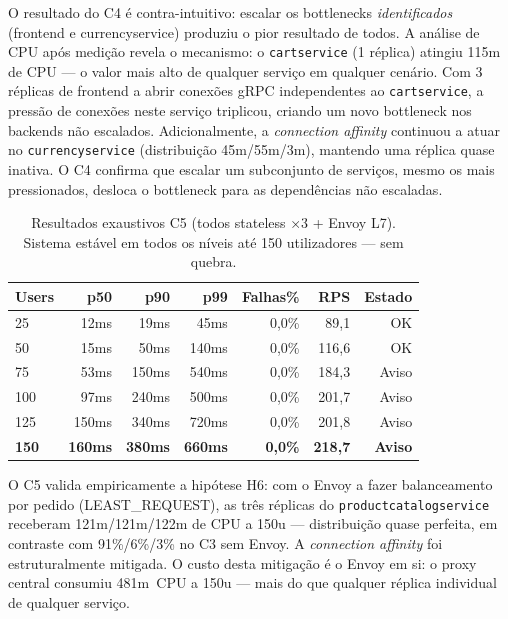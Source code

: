 \documentclass[acmsmall,screen=true,nonacm]{acmart}
\begin{document}
O resultado do C4 é contra-intuitivo: escalar os bottlenecks \emph{identificados} (frontend e currencyservice) produziu o pior resultado de todos. A análise de CPU após medição revela o mecanismo: o \texttt{cartservice} (1 réplica) atingiu 115m de CPU --- o valor mais alto de qualquer serviço em qualquer cenário. Com 3 réplicas de frontend a abrir conexões gRPC independentes ao \texttt{cartservice}, a pressão de conexões neste serviço triplicou, criando um novo bottleneck nos backends não escalados. Adicionalmente, a \textit{connection affinity} continuou a atuar no \texttt{currencyservice} (distribuição 45m/55m/3m), mantendo uma réplica quase inativa. O C4 confirma que escalar um subconjunto de serviços, mesmo os mais pressionados, desloca o bottleneck para as dependências não escaladas.

\begin{table}[h]
\caption{Resultados exaustivos C5 (todos stateless ×3 + Envoy L7). Sistema estável em todos os níveis até 150 utilizadores — sem quebra.}
\label{tab:c5ex}
\begin{tabular}{lrrrrrr}
\toprule
\textbf{Users} & \textbf{p50} & \textbf{p90} & \textbf{p99} & \textbf{Falhas\%} & \textbf{RPS} & \textbf{Estado} \\
\midrule
25  & 12ms  & 19ms  & 45ms  & 0,0\% & 89,1  & OK \\
50  & 15ms  & 50ms  & 140ms & 0,0\% & 116,6 & OK \\
75  & 53ms  & 150ms & 540ms & 0,0\% & 184,3 & Aviso \\
100 & 97ms  & 240ms & 500ms & 0,0\% & 201,7 & Aviso \\
125 & 150ms & 340ms & 720ms & 0,0\% & 201,8 & Aviso \\
\textbf{150} & \textbf{160ms} & \textbf{380ms} & \textbf{660ms} & \textbf{0,0\%} & \textbf{218,7} & \textbf{Aviso} \\
\bottomrule
\end{tabular}
\end{table}

O C5 valida empiricamente a hipótese H6: com o Envoy a fazer balanceamento por pedido (LEAST\_REQUEST), as três réplicas do \texttt{productcatalogservice} receberam 121m/121m/122m de CPU a 150u — distribuição quase perfeita, em contraste com 91\%/6\%/3\% no C3 sem Envoy. A \textit{connection affinity} foi estruturalmente mitigada. O custo desta mitigação é o Envoy em si: o proxy central consumiu 481m~CPU a 150u — mais do que qualquer réplica individual de qualquer serviço.
\end{document}

